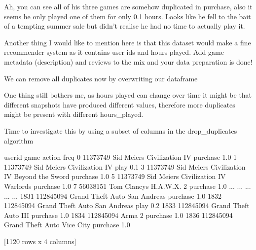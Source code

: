 \documentclass[letterpaper,10pt,english]{jupyterBook}
\begin{document}
\sphinxAtStartPar
Ah, you can see all of his three games are somehow duplicated in purchase, also it seems he only played one of them for only 0.1 hours.
Looks like he fell to the bait of a tempting summer sale but didn’t realise he had no time to actually play it.

\sphinxAtStartPar
Another thing I would like to mention here is that this dataset would make a fine recommender system as it contains user ids and hours played.
Add game metadata (description) and reviews to the mix and your data preparation is done!

\sphinxAtStartPar
We can remove all duplicates now by overwriting our dataframe

\begin{sphinxVerbatim}[commandchars=\\\{\}]
  
\end{sphinxVerbatim}

\sphinxAtStartPar
One thing still bothers me, as hours played can change over time it might be that different snapshots have produced different values, therefore more duplicates might be present with different hours\_played.

\sphinxAtStartPar
Time to investigate this by using a subset of columns in the drop\_duplicates algorithm

\begin{sphinxVerbatim}[commandchars=\\\{\}]
\PYG{p}{[}  \PYG{p}{]}
\end{sphinxVerbatim}

\begin{sphinxVerbatim}[commandchars=\\\{\}]
        user\PYGZus{}id                                          game    action  freq
0      11373749                   Sid Meier\PYGZsq{}s Civilization IV  purchase   1.0
1      11373749                   Sid Meier\PYGZsq{}s Civilization IV      play   0.1
3      11373749  Sid Meier\PYGZsq{}s Civilization IV Beyond the Sword  purchase   1.0
5      11373749          Sid Meier\PYGZsq{}s Civilization IV Warlords  purchase   1.0
7      56038151                       Tom Clancy\PYGZsq{}s H.A.W.X. 2  purchase   1.0
...         ...                                           ...       ...   ...
1831  112845094                  Grand Theft Auto San Andreas  purchase   1.0
1832  112845094                  Grand Theft Auto San Andreas      play   0.2
1833  112845094                          Grand Theft Auto III  purchase   1.0
1834  112845094                                        Arma 2  purchase   1.0
1836  112845094                    Grand Theft Auto Vice City  purchase   1.0

[1120 rows x 4 columns]
\end{sphinxVerbatim}
\end{document}
